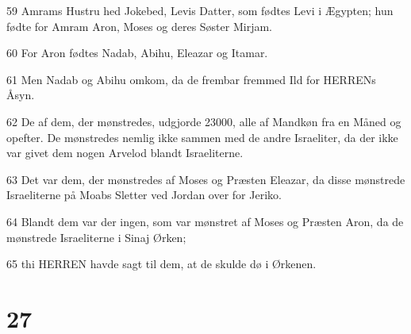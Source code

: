 \par 59 Amrams Hustru hed Jokebed, Levis Datter, som fødtes Levi i Ægypten; hun fødte for Amram Aron, Moses og deres Søster Mirjam.
\par 60 For Aron fødtes Nadab, Abihu, Eleazar og Itamar.
\par 61 Men Nadab og Abihu omkom, da de frembar fremmed Ild for HERRENs Åsyn.
\par 62 De af dem, der mønstredes, udgjorde 23000, alle af Mandkøn fra en Måned og opefter. De mønstredes nemlig ikke sammen med de andre Israeliter, da der ikke var givet dem nogen Arvelod blandt Israeliterne.
\par 63 Det var dem, der mønstredes af Moses og Præsten Eleazar, da disse mønstrede Israeliterne på Moabs Sletter ved Jordan over for Jeriko.
\par 64 Blandt dem var der ingen, som var mønstret af Moses og Præsten Aron, da de mønstrede Israeliterne i Sinaj Ørken;
\par 65 thi HERREN havde sagt til dem, at de skulde dø i Ørkenen.

\chapter{27}

